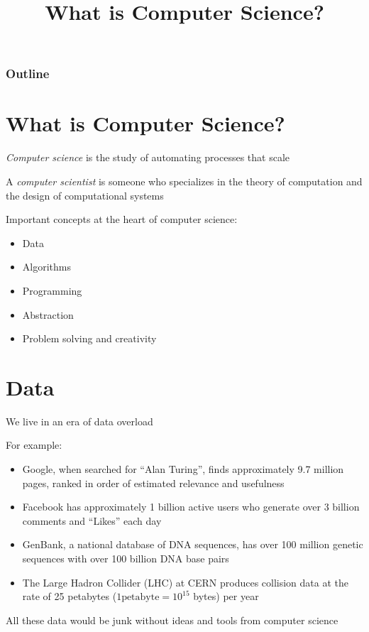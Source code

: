 \documentclass[8pt,a4paper,compress]{beamer}
\title{What is Computer Science?}
\date{}
\begin{document}
\begin{frame}
\vfill
\titlepage
\end{frame}

\begin{frame}
\frametitle{Outline}
\tableofcontents
\end{frame}

\section{What is Computer Science?}
\begin{frame}[fragile]
\emph{Computer science} is the study of automating processes that scale

\bigskip

A \emph{computer scientist} is someone who specializes in the theory of computation and the design of computational systems

\bigskip

Important concepts at the heart of computer science:
\begin{itemize}
\item Data
\item Algorithms
\item Programming
\item Abstraction
\item Problem solving and creativity
\end{itemize}
\end{frame}

\section{Data}
\begin{frame}[fragile]
We live in an era of data overload

\bigskip

For example:
\begin{itemize}
\item Google, when searched for ``Alan Turing'', finds approximately 9.7 million pages, ranked in order of estimated relevance and usefulness 
\item Facebook has approximately 1 billion active users who generate over 3 billion comments and ``Likes'' each day 
\item GenBank, a national database of DNA sequences, has over 100 million genetic sequences with over 100 billion DNA base pairs 
\item The Large Hadron Collider (LHC) at CERN produces collision data at the rate of 25 petabytes ($1 \text{petabyte} = 10^{15}$ bytes) per year
\end{itemize}

\bigskip

All these data would be junk without ideas and tools from computer science
\end{frame}
\end{document}
